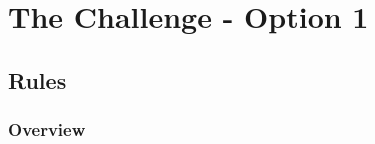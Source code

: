 \documentclass[11pt,a4paper]{article}
\begin{document}

\pagebreak
\section{The Challenge - Option 1}

\subsection{Rules}

\subsubsection*{Overview}
\end{document}
